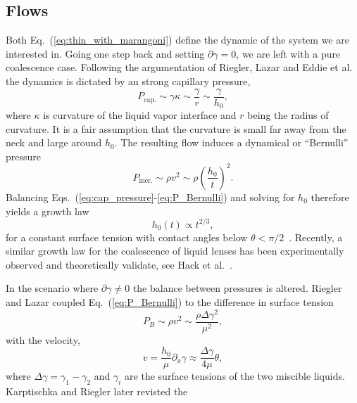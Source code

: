 \documentclass[twocolumn,amsmath,amssymb,showpacs,pre,nofootinbib,superscriptaddress]{revtex4-1} %
\begin{document}
\subsection{Flows}\label{subsec:flows_theory}
Both Eq.~(\ref{eq:thin_with_marangoni}) define the dynamic of the system we are interested in.
Going one step back and setting $\partial\gamma = 0$, we are left with a pure coalescence case.
Following the argumentation of Riegler, Lazar and Eddie et al.~\cite{doi:10.1021/la800630w, PhysRevLett.111.144502} the dynamics is dictated by an strong capillary pressure,
\begin{equation}\label{eq:cap_pressure}
    P_{\text{cap.}} \sim\gamma\kappa \sim \frac{\gamma}{r} \sim \frac{\gamma}{h_0},
\end{equation}
where $\kappa$ is curvature of the liquid vapor interface and $r$ being the radius of curvature. 
It is a fair assumption that the curvature is small far away from the neck and large around $h_0$.
The resulting flow induces a dynamical or ``Bernulli'' pressure
\begin{equation}\label{eq:P_Bernulli}
    P_{\text{iner.}} \sim \rho v^2 \sim \rho\left(\frac{h_0}{t}\right)^2.
\end{equation}
Balancing Eqs.~(\ref{eq:cap_pressure}-\ref{eq:P_Bernulli}) and solving for $h_0$ therefore yields a growth law 
\begin{equation}\label{eq:coal_powerlaw}
    h_0(t) \propto t^{2/3},
\end{equation}
for a constant surface tension with contact angles below $\theta < \pi/2$~\cite{PhysRevLett.111.144502, keller2002breaking}.
Recently, a similar growth law for the coalescence of liquid lenses has been experimentally observed and theoretically validate, see Hack et al.~\cite{PhysRevLett.124.194502}.

In the scenario where $\partial\gamma \neq 0$ the balance between pressures is altered.
Riegler and Lazar coupled Eq.~(\ref{eq:P_Bernulli}) to the difference in surface tension~\cite{doi:10.1021/la800630w}
\begin{equation}\label{eq:P_bernulli_riegler}
    P_{B} \sim \rho v^2 \sim \frac{\rho \Delta\gamma^2}{\mu^2}, 
\end{equation}
with the velocity,
\begin{equation}\label{eq:vel_riegler}
    v = \frac{h_0}{\mu}\partial_x\gamma\approx\frac{\Delta\gamma}{4\mu}\theta,
\end{equation}
where $\Delta\gamma = \gamma_1 - \gamma_2$ and $\gamma_i$ are the surface tensions of the two miscible liquids.
Karptischka and Riegler later revisted the 
\end{document}
